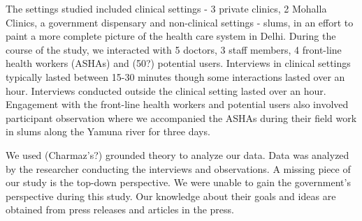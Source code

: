 The settings studied included clinical settings - 3 private clinics, 2 Mohalla Clinics, a government dispensary and non-clinical settings - slums, in an effort to paint a more complete picture of the health care system in Delhi. During the course of the study, we interacted with 5 doctors, 3 staff members, 4 front-line health workers (ASHAs) and (50?) potential users. Interviews in clinical settings typically lasted between 15-30 minutes though some interactions lasted over an hour. Interviews conducted outside the clinical setting lasted over an hour. Engagement with the front-line health workers and potential users also involved participant observation where we accompanied the ASHAs during their field work in slums along the Yamuna river for three days.

We used (Charmaz's?) grounded theory to analyze our data. Data was analyzed by the researcher conducting the interviews and observations. A missing piece of our study is the top-down perspective. We were unable to gain the government's perspective during this study. Our knowledge about their goals and ideas are obtained from press releases and articles in the press.